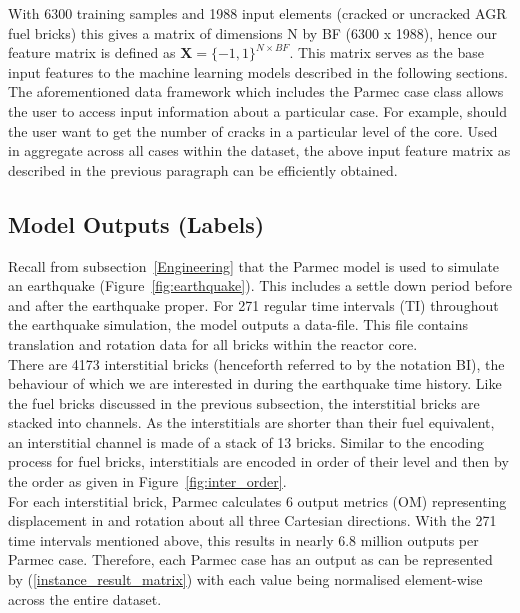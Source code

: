 \noindent
With 6300 training samples and 1988 input elements (cracked or uncracked AGR fuel bricks) this gives a matrix of dimensions N by BF (6300 x 1988), hence our feature matrix is defined as $\textbf{X} = \{-1, 1\}^{N \times BF}$. This matrix serves as the base input features to the machine learning models described in the following sections. 
\\

\noindent
The aforementioned data framework which includes the Parmec case class allows the user to access input information about a particular case.  For example, should the user want to get the number of cracks in a particular level of the core. Used in aggregate across all cases within the dataset, the above input feature matrix as described in the previous paragraph can be efficiently obtained. 


\subsection{Model Outputs (Labels)} \label{data:outputs}


Recall from subsection~\ref{Engineering} that the Parmec model is used to simulate an earthquake (Figure~\ref{fig:earthquake}). This includes a settle down period before and after the earthquake proper. For 271 regular time intervals (TI) throughout the earthquake simulation, the model outputs a data-file. This file contains translation and rotation data for all bricks within the reactor core. 
\\

\noindent
There are 4173 interstitial bricks (henceforth referred to by the notation BI), the behaviour of which we are interested in during the earthquake time history. Like the fuel bricks discussed in the previous subsection, the interstitial bricks are stacked into channels. As the interstitials are shorter than their fuel equivalent, an interstitial channel is made of a stack of 13 bricks. Similar to the encoding process for fuel bricks, interstitials are encoded in order of their level and then by the order as given in Figure~\ref{fig:inter_order}.
\\

\noindent
For each interstitial brick, Parmec calculates 6 output metrics (OM) representing displacement in and rotation about all three Cartesian directions. With the 271 time intervals mentioned above, this results in nearly 6.8 million outputs per Parmec case. Therefore, each Parmec case has an output as can be represented by (\ref{instance_result_matrix}) with each value being normalised element-wise across the entire dataset.  
\\


